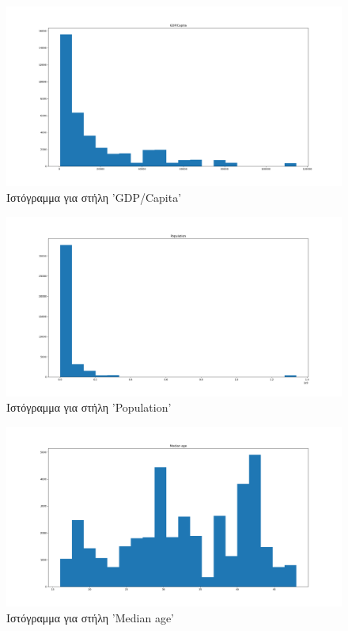 \documentclass[12pt,a4paper]{article}
\begin{document}
\begin{figure}[H]
	\includegraphics[width=\textwidth]{Figures/Question1/7. Histogram for GDP over capita.png}
	\caption{Ιστόγραμμα για στήλη 'GDP/Capita'}
\end{figure}

\begin{figure}[H]
	\includegraphics[width=\textwidth]{Figures/Question1/8. Histogram for population.png}
	\caption{Ιστόγραμμα για στήλη 'Population'}
\end{figure}

\begin{figure}[H]
	\includegraphics[width=\textwidth]{Figures/Question1/9. Histogram for median age.png}
	\caption{Ιστόγραμμα για στήλη 'Median age'}
\end{figure}
\end{document}
